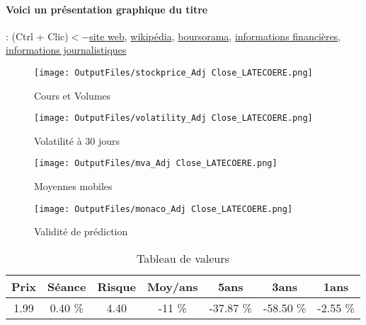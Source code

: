 \documentclass[11pt,a4paper]{report}%
\begin{document}
\paragraph{Voici un présentation graphique du titre} : (Ctrl + Clic)$<-$\href{https://www.latecoere.aero/}{site web}, \href{https://fr.wikipedia.org/wiki/Groupe_Lat%C3%A9co%C3%A8re}{wikipédia}, \href{https://www.boursorama.com/cours/1rPLAT}{boursorama}, \href{https://www.qwant.com/?q=site:https:%2f%2fwww.easybourse.com%2faction-societe%2fLATECOERE&t=web&client=ext-firefox-hp}{informations financières}, \href{https://bourse.lerevenu.com/cours-de-bourse/fiche-valeur-synthese/LATECOERE/LAT-FR}{informations journalistiques}
\begin{figure}[!htb]
   \begin{minipage}{0.5\textwidth}
     \centering
     \texttt{[image: OutputFiles/stockprice\_Adj Close\_LATECOERE.png]}
     \caption{Cours et Volumes}\label{Fig:price_LATECOERE}
   \end{minipage}\hfill
   \begin{minipage}{0.5\textwidth}
     \centering
     \texttt{[image: OutputFiles/volatility\_Adj Close\_LATECOERE.png]}
     \caption{Volatilité à 30 jours}\label{Fig:volat_LATECOERE}
   \end{minipage}
\end{figure}
\begin{figure}[!htb]
   \begin{minipage}{0.5\textwidth}
     \centering
     \texttt{[image: OutputFiles/mva\_Adj Close\_LATECOERE.png]}
     \caption{Moyennes mobiles}\label{Fig:mva_LATECOERE}
   \end{minipage}\hfill
   \begin{minipage}{0.5\textwidth}
     \centering
     \texttt{[image: OutputFiles/monaco\_Adj Close\_LATECOERE.png]}
     \caption{Validité de prédiction}\label{Fig:prediction_LATECOERE}
   \end{minipage}
\end{figure}

\begin{table}[H]
  \centering
    \begin{tabular}{|c|c|c|c|c|c|c|}
    \hline
    Prix & Séance & Risque  & Moy/ans & 5ans & 3ans & 1ans \\
    \hline
    1.99 &    0.40 \%    & 4.40 & -11 \% & -37.87 \% & -58.50 \% & -2.55 \% \\
    \hline
    \end{tabular}%
        \label{tab:table_LATECOERE}%
      \caption{Tableau de valeurs}
\end{table}%
\end{document}
